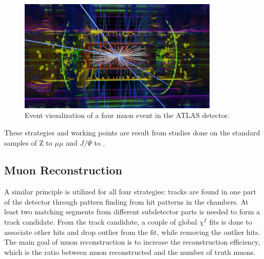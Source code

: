 \begin{figure}[!htb]
    \begin{center}
        \includegraphics[width=0.85\textwidth]{figures/common_ana/Muon}
        \caption{        
            Event visualization of a four muon event in the ATLAS detector\cite{ATLAS:1697053}.
        }
    \end{center}
\end{figure}

These strategies and working points are result from studies done on the standard samples of Z to $\mu \mu $ and $J/\Psi$ to \mu \mu. 

\subsection{Muon Reconstruction}
A similar principle is utilized for all four strategies: tracks are found in one part of the detector through pattern finding from hit patterns in the chambers. At least two matching segments from different subdetector parts is needed to form a track candidate. From the track candidate, a couple of global $\chi^{2}$ fits is done to associate other hits and drop outlier from the fit, while removing the outlier hits. The main goal of muon reconstruction is to increase the
reconstruction efficiency, which is the ratio between muon reconstructed and the number of truth muons. 

